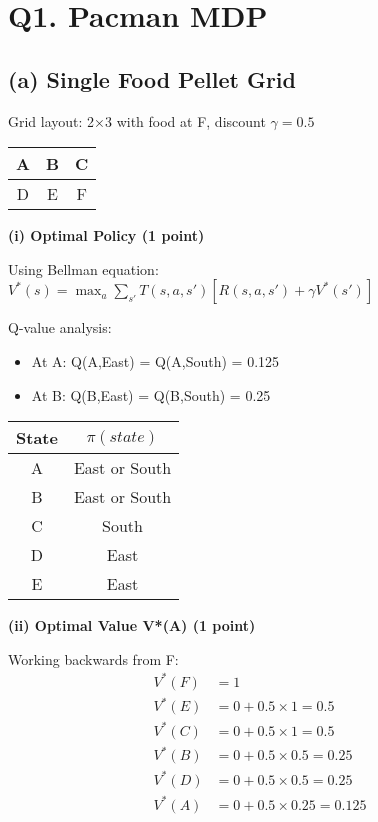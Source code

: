 \documentclass[11pt]{article}
\begin{document}
\section{Q1. Pacman MDP}

\subsection{(a) Single Food Pellet Grid}
Grid layout: 2×3 with food at F, discount $\gamma = 0.5$

\begin{center}
\begin{tabular}{|c|c|c|}
\hline
A & B & C \\
\hline
D & E & F \\
\hline
\end{tabular}
\end{center}

\textbf{(i) Optimal Policy (1 point)}

Using Bellman equation: $V^*(s) = \max_a \sum_{s'} T(s,a,s')[R(s,a,s') + \gamma V^*(s')]$

Q-value analysis:
\begin{itemize}
\item At A: Q(A,East) = Q(A,South) = 0.125
\item At B: Q(B,East) = Q(B,South) = 0.25
\end{itemize}

\begin{center}
\begin{tabular}{|c|c|}
\hline
State & $\pi(state)$ \\
\hline
A & East or South \\
B & East or South \\
C & South \\
D & East \\
E & East \\
\hline
\end{tabular}
\end{center}

\textbf{(ii) Optimal Value V*(A) (1 point)}

Working backwards from F:
\begin{align*}
V^*(F) &= 1 \\
V^*(E) &= 0 + 0.5 \times 1 = 0.5 \\
V^*(C) &= 0 + 0.5 \times 1 = 0.5 \\
V^*(B) &= 0 + 0.5 \times 0.5 = 0.25 \\
V^*(D) &= 0 + 0.5 \times 0.5 = 0.25 \\
V^*(A) &= 0 + 0.5 \times 0.25 = 0.125
\end{align*}
\end{document}

